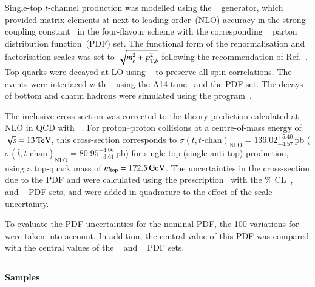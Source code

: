 Single-top \(t\)-channel production was modelled using the
\POWHEGBOX[v2]~\cite{Frederix:2012dh,Nason:2004rx,Frixione:2007vw,Alioli:2010xd}
generator, which provided matrix elements at next-to-leading-order~(NLO)
accuracy in the strong coupling constant \alphas\ in the four-flavour
scheme with the corresponding \NNPDF[3.0nlo]~\cite{Ball:2014uwa} parton
distribution function~(PDF) set.  The functional form of the
renormalisation and factorisation scales was set to
\(\sqrt{m_b^2 + \pTX[2][b]}\) following the
recommendation of Ref.~\cite{Frederix:2012dh}. Top quarks were decayed at
LO using \MADSPIN~\cite{Frixione:2007zp,Artoisenet:2012st} to preserve
all spin correlations.  The events were interfaced with
\PYTHIA[8.230]~\cite{Sjostrand:2014zea} using the A14
tune~\cite{ATL-PHYS-PUB-2014-021} and the \NNPDF[2.3lo] PDF set.
The decays of bottom and charm hadrons were simulated using the
\EVTGEN[1.6.0] program~\cite{Lange:2001uf}.

The inclusive cross-section was corrected to the theory prediction calculated at NLO in QCD with
\HATHOR[2.1]~\cite{Aliev:2010zk,Kant:2014oha}.
For proton--proton collisions at a centre-of-mass energy of \(\sqrt{s} = \SI{13}{\ensuremath{\text{TeV}}}\), this cross-section corresponds to
\(\sigma(t,t\text{-chan})_\text{NLO}= 136.02^{+5.40}_{-4.57}\)\,pb (\(\sigma(\bar{t},t\text{-chan})_\text{NLO}=80.95^{+4.06}_{-3.61}\)\,pb)
for single-top (single-anti-top) production, using a top-quark mass of \(m_{\text{top}} = \SI{172.5}{\ensuremath{\text{GeV}}}\).
The uncertainties in the cross-section due to the PDF and \alphas were calculated using the \PDFforLHC prescription~\cite{Butterworth:2015oua}
with the \% CL~\cite{Martin:2009iq,Martin:2009bu}, \CT[10nlo]~\cite{Lai:2010vv}
and \NNPDF[2.3nlo]~\cite{Ball:2012cx} PDF sets,
and were added in quadrature to the effect of the scale uncertainty.



To evaluate the PDF uncertainties for the nominal PDF, the 100 variations for \NNPDF[3.0nlo] were taken into account.
In addition, the central value of this PDF was compared with the central values of the \CT[14nnlo]~\cite{Dulat:2015mca}
and \MMHT[nnlo]~\cite{Harland-Lang:2014zoa} PDF sets.


\subsection[Powheg+Herwig7]{\POWHER[7]}
\label{subsubsec:tchan_PH7}

\paragraph{Samples}

